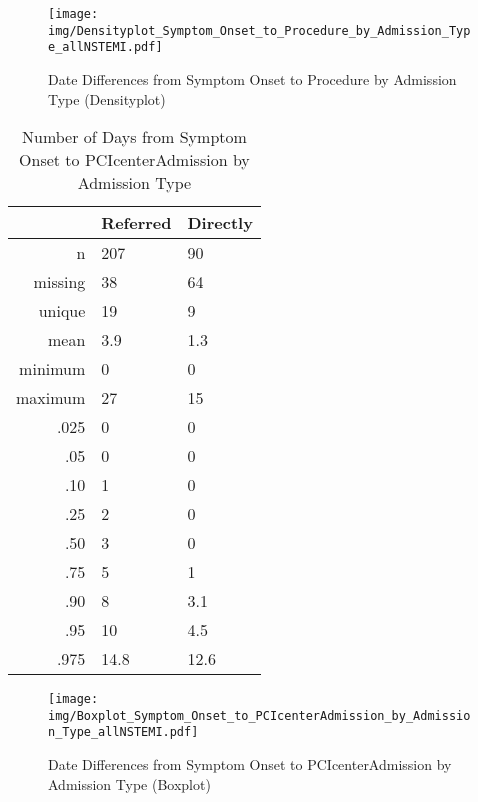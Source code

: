 \documentclass[presentation,xcolor=pdftex,dvipsnames,table,11pt]{beamer}
\begin{document}
\begin{tiny}
\begin{frame}
\begin{figure}
  \centering
  \caption{Date Differences from Symptom Onset to Procedure by Admission Type (Densityplot)}
  \label{Density: Date Differences from Symptom Onset to Procedure by Admission Type}
\texttt{[image: img/Densityplot\_Symptom\_Onset\_to\_Procedure\_by\_Admission\_Type\_allNSTEMI.pdf]}\end{figure}
\end{frame}




\begin{table}[ht]
\centering
\begin{tabular}{rll}
  \toprule
 & Referred & Directly \\ 
  \midrule
n & 207 & 90 \\ 
  missing & 38 & 64 \\ 
  unique & 19 & 9 \\ 
  mean & 3.9 & 1.3 \\ 
  minimum & 0 & 0 \\ 
  maximum & 27 & 15 \\ 
  .025 & 0 & 0 \\ 
  .05 & 0 & 0 \\ 
  .10 & 1 & 0 \\ 
  .25 & 2 & 0 \\ 
  .50 & 3 & 0 \\ 
  .75 & 5 & 1 \\ 
  .90 & 8 & 3.1 \\ 
  .95 & 10 & 4.5 \\ 
  .975 & 14.8 & 12.6 \\ 
   \bottomrule
\end{tabular}
\caption{Number of Days from Symptom Onset to PCIcenterAdmission by Admission Type} 
\end{table}
\begin{frame}
\begin{figure}
  \centering
  \caption{Date Differences from Symptom Onset to PCIcenterAdmission by Admission Type (Boxplot)}
  \label{Boxplot: Date Differences from Symptom Onset to PCIcenterAdmission by Admission Type}
\texttt{[image: img/Boxplot\_Symptom\_Onset\_to\_PCIcenterAdmission\_by\_Admission\_Type\_allNSTEMI.pdf]}\end{figure}
\end{frame}



\end{tiny}
\end{document}
